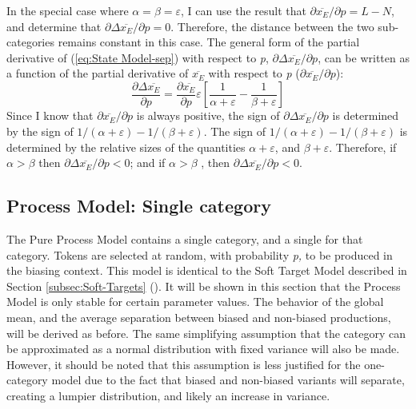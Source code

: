 In the special case where $\alpha=\beta=\varepsilon$, I can use
the result that ${\partial\overline{x_{E}}}/{\partial p}=L-N$,
and determine that ${\partial\Delta\overline{x_{E}}}/{\partial p}=0$.
Therefore, the distance between the two sub-categories remains constant
in this case. The general form of the partial derivative of (\ref{eq:State Model-sep})
with respect to \emph{p}, ${\partial\Delta\overline{x_{E}}}/{\partial p}$,
can be written as a function of the partial derivative of $\overline{x_{E}}$
with respect to \emph{p} (${\partial\overline{x_{E}}}/{\partial p}$):
\begin{equation}
\frac{\partial\Delta\overline{x_{E}}}{\partial p}=\frac{\partial\overline{x_{E}}}{\partial p}\varepsilon\left[\frac{1}{\alpha+\varepsilon}-\frac{1}{\beta+\varepsilon}\right]\label{eq: Model G: dsep/dp}
\end{equation}
Since I know that ${\partial\overline{x_{E}}}/{\partial p}$
is always positive, the sign of ${\partial\Delta\overline{x_{E}}}/{\partial p}$
is determined by the sign of ${1}/({\alpha+\varepsilon})-{1}/({\beta+\varepsilon})$.
The sign of ${1}/({\alpha+\varepsilon})-{1}/({\beta+\varepsilon})$
is determined by the relative sizes of the quantities $\alpha+\varepsilon$,
and $\beta+\varepsilon$. Therefore, if $\alpha>\beta$ then ${\partial\Delta\overline{x_{E}}}/{\partial p}<0$;
and if $\alpha>\beta$ , then ${\partial\Delta\overline{x_{E}}}/{\partial p}<0$.

\subsection{\label{subsec:Model-B:-Lengthening}Process Model: Single category}

The Pure Process Model contains a single category, and a single 
for that category. Tokens are selected at random, with probability
\emph{p,} to be produced in the biasing context. This model is identical
to the Soft Target Model described in Section \ref{subsec:Soft-Targets}
(). It will be shown in this
section that the Process Model is only stable for certain parameter
values. The behavior of the global mean, and the average separation
between biased and non-biased productions, will be derived as before.
The same simplifying assumption that the category can be approximated
as a normal distribution with fixed variance will also be made. However,
it should be noted that this assumption is less justified for the
one-category model due to the fact that biased and non-biased variants
will separate, creating a lumpier distribution, and likely an increase
in variance.

